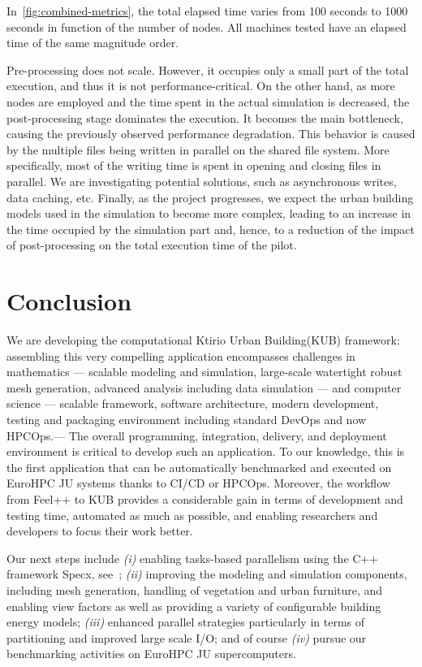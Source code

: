 \documentclass[runningheads]{llncs}
\begin{document}
In~\cref{fig:combined-metrics}, the total elapsed time varies from 100 seconds to 1000 seconds in function of the number of nodes.
All machines tested have an elapsed time of the same magnitude order.

Pre-processing does not scale. However, it occupies only a small part of the total execution, and thus it is not performance-critical. On the other hand, as more nodes are employed and the time spent in the actual simulation is decreased, the post-processing stage dominates the execution. It becomes the main bottleneck, causing the previously observed performance degradation.
This behavior is caused by the multiple files being written in parallel on the shared file system. More specifically, most of the writing time is spent in opening and closing files in parallel. We are investigating potential solutions, such as asynchronous writes, data caching, etc. Finally, as the project progresses, we expect the urban building models used in the simulation to become more complex, leading to an increase in the time occupied by the simulation part and, hence, to a reduction of the impact of post-processing on the total execution time of the pilot.


\section{Conclusion}

We are developing the computational Ktirio Urban Building(KUB) framework: assembling this very compelling application encompasses challenges in mathematics --- scalable modeling and simulation, large-scale watertight robust mesh generation, advanced analysis including data simulation --- and computer science --- scalable framework, software architecture, modern development, testing and packaging environment including standard DevOps and now HPCOps.---
The overall programming, integration, delivery, and deployment environment is critical to develop such an application. To our knowledge, this is the first application that can be automatically benchmarked and executed on EuroHPC JU systems thanks to CI/CD or HPCOps. Moreover, the workflow from Feel++ to KUB provides a considerable gain in terms of development and testing time, automated as much as possible, and enabling researchers and developers to focus their work better.

Our next steps include \textit{(i)} enabling tasks-based parallelism using the C++ framework Specx, see~\cite{cardosi_specx_2022}; \textit{(ii)} improving the modeling and simulation components, including mesh generation, handling of vegetation and urban furniture, and enabling view factors as well as providing a variety of configurable building energy models; \textit{(iii)} enhanced parallel strategies particularly in terms of partitioning and improved large scale I/O; and of course \textit{(iv)} pursue our benchmarking activities on EuroHPC JU supercomputers.
\end{document}
